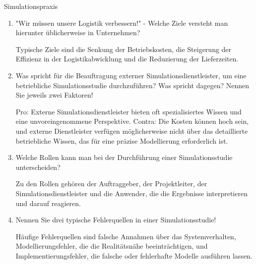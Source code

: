 \documentclass{article}
\begin{document}
\begin{exercise}{Simulationspraxis}
  \begin{enumerate}
    \item "Wir müssen unsere Logistik verbessern!" - Welche Ziele versteht man hierunter üblicherweise in Unternehmen?
          \begin{solution}
            Typische Ziele sind die Senkung der Betriebskosten, die Steigerung der Effizienz in der Logistikabwicklung und die Reduzierung der Lieferzeiten.
          \end{solution}

    \item Was spricht für die Beauftragung externer Simulationsdienstleister, um eine betriebliche Simulationsstudie durchzuführen? Was spricht dagegen? Nennen Sie jeweils zwei Faktoren!
          \begin{solution}
            Pro: Externe Simulationsdienstleister bieten oft spezialisiertes Wissen und eine unvoreingenommene Perspektive. Contra: Die Kosten können hoch sein, und externe Dienstleister verfügen möglicherweise nicht über das detaillierte betriebliche Wissen, das für eine präzise Modellierung erforderlich ist.
          \end{solution}

    \item Welche Rollen kann man bei der Durchführung einer Simulationsstudie unterscheiden?
          \begin{solution}
            Zu den Rollen gehören der Auftraggeber, der Projektleiter, der Simulationsdienstleister und die Anwender, die die Ergebnisse interpretieren und darauf reagieren.
          \end{solution}

    \item Nennen Sie drei typische Fehlerquellen in einer Simulationsstudie!
          \begin{solution}
            Häufige Fehlerquellen sind falsche Annahmen über das Systemverhalten, Modellierungsfehler, die die Realitätsnähe beeinträchtigen, und Implementierungsfehler, die falsche oder fehlerhafte Modelle ausführen lassen.
          \end{solution}
  \end{enumerate}
\end{exercise}
\end{document}
